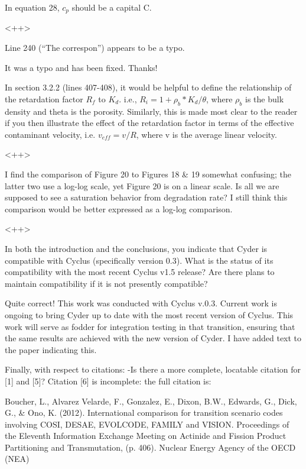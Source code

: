 \documentclass[answers,12pt]{exam}
\begin{document}
\begin{questions}
\question In equation 28, $c_p$ should be a capital C.
\begin{solution}
<++>
\end{solution}

\question Line 240 (``The correspon'') appears to be a typo.
\begin{solution}
It was a typo and has been fixed. Thanks!
\end{solution}

\question In section 3.2.2 (lines 407-408), it would be helpful to define the relationship of the retardation factor $R_f$ to $K_d$. i.e., $R_i = 1 + \rho_b 
* K_d / \theta$, where $\rho_b$ is the bulk density and theta is the porosity.  Similarly, this is made most clear to the reader if you then illustrate the effect of the retardation factor in terms of the effective contaminant velocity, i.e. $v_{eff} = v/R$, where v is the average linear velocity.
\begin{solution}
<++>
\end{solution}

\question I find the comparison of Figure 20 to Figures 18 \& 19 somewhat confusing; the latter two use a log-log scale, yet Figure 20 is on a linear scale. Is all we are supposed to see a saturation behavior from degradation rate? I still think this comparison would be better expressed as a log-log comparison.
\begin{solution}
<++>
\end{solution}

\question In both the introduction and the conclusions, you indicate that Cyder is compatible with Cyclus (specifically version 0.3). What is the status of its compatibility with the most recent Cyclus v1.5 release? Are there plans to maintain compatibility if it is not presently compatible?
\begin{solution}
Quite correct! This work was conducted with Cyclus v.0.3. Current work is ongoing to 
bring Cyder up to date with the most recent version of Cyclus. This work will 
serve as fodder for integration testing in that transition, ensuring that the 
same results are achieved with the new version of Cyder. I have added text to 
the paper indicating this.
\end{solution}

\question Finally, with respect to citations: 
-Is there a more complete, locatable citation for [1] and [5]? Citation [6] is incomplete: the full citation is:

Boucher, L., Alvarez Velarde, F., Gonzalez, E., Dixon, B.W., Edwards, G., Dick, 
G., \& Ono, K. (2012). International comparison for transition scenario codes involving COSI, DESAE, EVOLCODE, FAMILY and VISION. Proceedings of the Eleventh Information Exchange Meeting on Actinide and Fission Product Partitioning and Transmutation, (p. 406). Nuclear Energy Agency of the OECD (NEA)


\end{questions}
\end{document}
